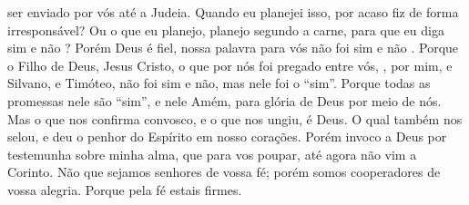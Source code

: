 {{} ser enviado por vós até a Judeia.
  Quando eu planejei isso, por acaso fiz de forma irresponsável? Ou o que eu planejo, planejo segundo a carne, para que eu diga sim e não
{} ?
  Porém
{} Deus é fiel, nossa palavra para vós não foi sim e não
{} .
  Porque o Filho de Deus, Jesus Cristo, o que por nós foi pregado entre vós,
{},  por mim, e Silvano, e Timóteo, não foi sim e não, mas nele foi o “sim”.
  Porque todas as promessas nele são “sim”, e nele
{} Amém, para glória de Deus por meio de nós.
  Mas o que nos confirma convosco, e o que nos ungiu, é Deus.
  O qual também nos selou, e
{} deu o penhor do Espírito em nosso corações.
  Porém invoco a Deus por testemunha sobre minha alma, que para vos poupar, até agora não vim a Corinto.
  Não que sejamos senhores de vossa fé; porém somos cooperadores de vossa alegria. Porque pela fé estais firmes.
\par }

